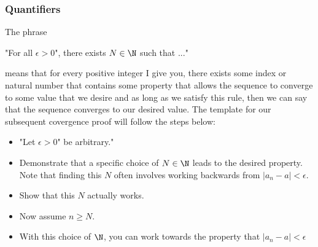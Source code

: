\subsubsection{Quantifiers}

The phrase 

\begin{center}
"For all \( \epsilon> 0 \)", there exists \( N \in \N \) such that ..."
\end{center}

means that for every positive integer I give you, there exists some index or natural number that contains some property that allows the sequence to converge to some value that we desire and as long as we satisfy this rule, then we can say that the sequence converges to our desired value. The template for our subsequent covergence proof will follow the steps below:

\begin{itemize}
    \item "Let \( \epsilon> 0 \)" be arbitrary."
    \item Demonstrate that a specific choice of \( N \in \N \) leads to the desired property. Note that finding this \( N \) often involves working backwards from \( |a_n - a | < \epsilon \). 
    \item Show that this \( N \) actually works.
    \item Now assume \( n \geq N \). 
    \item With this choice of \( \N \), you can work towards the property that \( |a_n - a | < \epsilon \)
\end{itemize}

